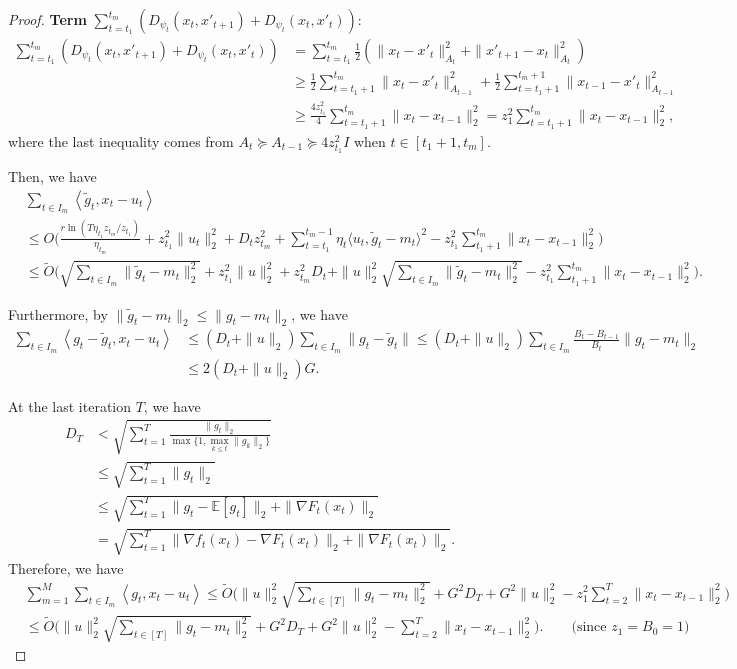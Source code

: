\documentclass{article}
\theoremstyle{plain}
\theoremstyle{definition}
\theoremstyle{remark}
\newcommand{\inner}[2]{\left\langle #1, #2 \right\rangle}
\renewcommand{\tilde}{\widetilde}
\begin{document}
\begin{proof}
\textbf{Term} $\sum_{t=t_1}^{t_m}(D_{\psi_t}(x_t,x'_{t+1})+D_{\psi_t}(x_t,x'_{t}))$:
\begin{align*}
\sum_{t=t_1}^{t_m}(D_{\psi_t}(x_t,x'_{t+1})+D_{\psi_t}(x_t,x'_{t}))&=\sum_{t=t_1}^{t_m}\frac{1}{2}(\|x_t-x'_{t}\|_{A_t}^2+\|x'_{t+1}-x_t\|_{A_t}^2)\\
&\geq \frac{1}{2}\sum_{t=t_1+1}^{t_m} \|x_t-x'_{t}\|_{A_{t-1}}^2+\frac{1}{2}\sum_{t=t_1+1}^{t_m+1}\|x_{t-1}-x'_t\|_{A_{t-1}}^2\\
&\geq \frac{4z_{t_1}^2}{4}\sum_{t=t_1+1}^{t_m}\|x_t-x_{t-1}\|_2^2=z_1^2\sum_{t=t_1+1}^{t_m}\|x_t-x_{t-1}\|_2^2,
\end{align*}
where the last inequality comes from $A_t\succeq A_{t-1}\succeq 4z_{t_1}^2 I$ when $t\in [t_1+1,t_m]$.

Then, we have
\begin{align*}
&\sum_{t \in I_m} \inner{\tilde{g}_t}{x_t - u_t}\\&\leq O\Big(\frac{r\ln(T\eta_{t_1} z_{t_m}/z_{t_1})}{\eta_{t_m}}+z_{t_1}^2\|u_t\|_2^2+D_t z_{t_m}^2+\sum_{t={t_1}}^{t_m-1} \eta_t\langle u_t,\tilde{g}_t-m_t\rangle^2-z_{t_1}^2 \sum_{t_1+1}^{t_m}\|x_t-x_{t-1}\|_2^2\Big)\\
&\leq \tilde{O}\Big(\sqrt{\sum_{t\in I_m}\| \tilde{g}_t - m_t \|_2^2}+z_{t_1}^2\|u\|_2^2+z_{t_m}^2D_t+\|u\|_2^2\sqrt{\sum_{t\in I_m}\| \tilde{g}_t - m_t \|_2^2}-z_{t_1}^2 \sum_{t_1+1}^{t_m}\|x_t-x_{t-1}\|_2^2\Big).
\end{align*}

Furthermore, by $\|\tilde{g}_t-m_t\|_2\leq \|g_t-m_t\|_2$, we have 
\begin{align*}
    \sum_{t \in I_m} \inner{g_t - \tilde{g}_t}{x_t - u_t} &\leq (D_t + \| u \|_2 ) \sum_{t \in I_m} \| g_t - \tilde{g}_t \| \leq (D_t + \| u \|_2 ) \sum_{t\in I_m} \frac{B_t - B_{t-1}}{B_t} \| g_t - m_t \|_2 \\
    &\leq 2(D_t + \| u \|_2 ) G.
\end{align*}

At the last iteration $T$, we have
\begin{align*}
D_T &< \sqrt{\sum_{t=1}^T\frac{\|g_t \|_2}{\max\{1,\max_{k \leq t} \| g_k \|_2 \}}}\\
&\leq \sqrt{\sum_{t=1}^T \|g_t\|_2}\\
&\leq \sqrt{\sum_{t=1}^T \|g_t-\mathbb{E}[g_t]\|_2+\|\nabla F_t(x_t)\|_2}\\
&=\sqrt{\sum_{t=1}^T \|\nabla f_t(x_t)-\nabla F_t(x_t)\|_2+\|\nabla F_t(x_t)\|_2}.
\end{align*}
Therefore, we have
\begin{align*}
&\sum_{m=1}^M\sum_{t \in I_m} \inner{g_t}{x_t - u_t}\leq \tilde{O}\Big(\|u\|_2^2\sqrt{\sum_{t\in [T]}\| g_t - m_t \|_2^2}+G^2D_T+G^2\|u\|_2^2-z_1^2\sum_{t=2}^T\|x_t-x_{t-1}\|_2^2\Big)\\
&\leq\tilde{O}\Big(\|u\|_2^2\sqrt{\sum_{t\in [T]}\| g_t - m_t \|_2^2}+G^2D_T+G^2\|u\|_2^2-\sum_{t=2}^T\|x_t-x_{t-1}\|_2^2\Big). \qquad \text{(since $z_1=B_0=1$)}
\end{align*}


\end{proof}
\end{document}
